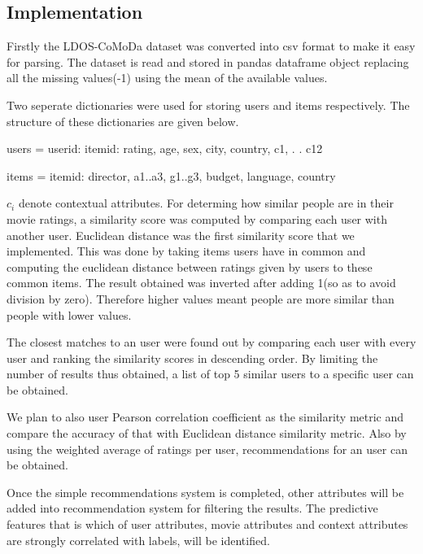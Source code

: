 \documentclass{article}
\begin{document}
\subsection{Implementation}

Firstly the LDOS-CoMoDa dataset was converted into csv format to make it easy for parsing. The dataset is read and stored in pandas dataframe object replacing all the missing values(-1) using the mean of the available values.

Two seperate dictionaries were used for storing users and items respectively. The structure of these dictionaries are given below.

users = 
	{userid: 
		{itemid:  
			rating, 
			age,
			sex,
			city,
			country, 
			c1,
			.
			.
			c12}}

items = 
	{itemid: 
		{director, 
		a1..a3,
		g1..g3, 
		budget, 
		language, 
		country}}
		
$c_{i}$ denote contextual attributes. For determing how similar people are in their movie ratings, a similarity score was computed by comparing each user with another user. Euclidean distance was the first similarity score that we implemented. This was done by taking items users have in common and computing the euclidean distance between ratings given by users to these common items. The result obtained was inverted after adding 1(so as to avoid division by zero). Therefore higher values meant people are more similar than people with lower values. 

The closest matches to an user were found out by comparing each user with every user and ranking the similarity scores in descending order. By limiting the number of results thus obtained, a list of top 5 similar users to a specific user can be obtained.

We plan to also user Pearson correlation coefficient as the similarity metric and compare the accuracy of that with Euclidean distance similarity metric. Also by using the weighted average of ratings per user,  recommendations for an user can be obtained. 

Once the simple recommendations system is completed, other attributes will be added into recommendation system for filtering the results. The predictive features that is which of user attributes, movie attributes and context attributes are strongly correlated with labels, will be identified. 
\end{document}
